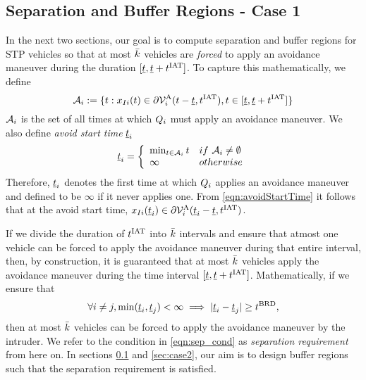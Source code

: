 \subsection{Separation and Buffer Regions - Case 1} \label{sec:case1}
In the next two sections, our goal is to compute separation and buffer regions for STP vehicles so that %
at most $\bar{k}$ vehicles are \textit{forced} to apply an avoidance maneuver during the duration $[\underline{t}, \underline{t}+t^\text{IAT}]$. To capture this mathematically, we define 
\begin{equation} \label{eqn:avoidStartTime}
\avoidt_{i} := \{t: \state_{\intr i}(t) \in \partial\brs^{\text{A}}_{i}(t-\tsa, \iat), t \in [\tsa, \tsa+\iat]\}
\end{equation} 
$\mathcal{A}_{i}$ is the set of all times at which $Q_i$ must apply an avoidance maneuver. We also define \textit{avoid start time} $\underline{t}_i$
\begin{equation} \label{eqn:avoidStartTime2}
\tsa_i  = 
\left \{ 
\begin{array}{ll}
\min_{t \in  \avoidt_{i}} t & \mbox{if~} \avoidt_{i} \neq \emptyset\\
\infty & \mbox{otherwise}
\end{array}
\right.
\end{equation}  
Therefore, $\underline{t}_i$ denotes the first time at which $Q_i$ applies an avoidance maneuver and defined to be $\infty$ if it never applies one. From \eqref{eqn:avoidStartTime} it follows that at the avoid start time, $x_{I i}(\underline{t}_i) \in  \partial\mathcal{V}^{\text{A}}_{i}(\underline{t}_i-\underline{t}, t^\text{IAT})$. %
 
If we divide the duration of $t^\text{IAT}$ into $\bar{k}$ intervals and ensure that atmost one vehicle can be forced to apply the avoidance maneuver during that entire interval, then, by construction, it is guaranteed that at most $\bar{k}$ vehicles apply the avoidance maneuver during the time interval $[\underline{t}, \underline{t}+t^\text{IAT}]$. Mathematically, if we ensure that 
\begin{equation} \label{eqn:sep_cond}
\forall i \neq j, \min(\tsa_i, \tsa_j)< \infty \implies |\tsa_i - \tsa_j| \geq \brd,
\end{equation}
then at most $\bar{k}$ vehicles can be forced to apply the avoidance maneuver by the intruder. We refer to the condition in \eqref{eqn:sep_cond} as \textit{separation requirement} from here on. In sections \ref{sec:case1} and \ref{sec:case2}, our aim is to design buffer regions such that the separation requirement is satisfied.   

